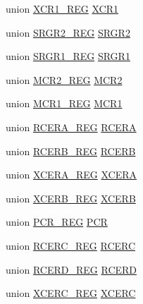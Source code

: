 \begin{DoxyCompactItemize}
\item 
union \hyperlink{union_x_c_r1___r_e_g}{X\+C\+R1\+\_\+\+R\+E\+G} \hyperlink{struct_m_c_b_s_p___r_e_g_s_aad55c90c38f0fbd7c28e0c393a1ca472}{X\+C\+R1}
\item 
union \hyperlink{union_s_r_g_r2___r_e_g}{S\+R\+G\+R2\+\_\+\+R\+E\+G} \hyperlink{struct_m_c_b_s_p___r_e_g_s_a9edcf839e2131e1d5ac33bec4dfdfbfd}{S\+R\+G\+R2}
\item 
union \hyperlink{union_s_r_g_r1___r_e_g}{S\+R\+G\+R1\+\_\+\+R\+E\+G} \hyperlink{struct_m_c_b_s_p___r_e_g_s_aaef2d7c327531024d56ef2c832abbe74}{S\+R\+G\+R1}
\item 
union \hyperlink{union_m_c_r2___r_e_g}{M\+C\+R2\+\_\+\+R\+E\+G} \hyperlink{struct_m_c_b_s_p___r_e_g_s_a2a492e51131b3e651c7b4cee60ac51d0}{M\+C\+R2}
\item 
union \hyperlink{union_m_c_r1___r_e_g}{M\+C\+R1\+\_\+\+R\+E\+G} \hyperlink{struct_m_c_b_s_p___r_e_g_s_a6b0b14fb015f09d3b12a1b8c81fb5e4e}{M\+C\+R1}
\item 
union \hyperlink{union_r_c_e_r_a___r_e_g}{R\+C\+E\+R\+A\+\_\+\+R\+E\+G} \hyperlink{struct_m_c_b_s_p___r_e_g_s_af8cfb2ab1a8c0573c24d932c00cda94c}{R\+C\+E\+R\+A}
\item 
union \hyperlink{union_r_c_e_r_b___r_e_g}{R\+C\+E\+R\+B\+\_\+\+R\+E\+G} \hyperlink{struct_m_c_b_s_p___r_e_g_s_a1ce056a4aa2e55b3084b0b660af84f6e}{R\+C\+E\+R\+B}
\item 
union \hyperlink{union_x_c_e_r_a___r_e_g}{X\+C\+E\+R\+A\+\_\+\+R\+E\+G} \hyperlink{struct_m_c_b_s_p___r_e_g_s_a327b0c3f44de6ccf8d67aed45d89bea0}{X\+C\+E\+R\+A}
\item 
union \hyperlink{union_x_c_e_r_b___r_e_g}{X\+C\+E\+R\+B\+\_\+\+R\+E\+G} \hyperlink{struct_m_c_b_s_p___r_e_g_s_a75cc4624019349288a3ae147f40139e9}{X\+C\+E\+R\+B}
\item 
union \hyperlink{union_p_c_r___r_e_g}{P\+C\+R\+\_\+\+R\+E\+G} \hyperlink{struct_m_c_b_s_p___r_e_g_s_a811bacb4abac4f8cc9c954e318e137d4}{P\+C\+R}
\item 
union \hyperlink{union_r_c_e_r_c___r_e_g}{R\+C\+E\+R\+C\+\_\+\+R\+E\+G} \hyperlink{struct_m_c_b_s_p___r_e_g_s_af968e751882febf7ce7206cd06b322c0}{R\+C\+E\+R\+C}
\item 
union \hyperlink{union_r_c_e_r_d___r_e_g}{R\+C\+E\+R\+D\+\_\+\+R\+E\+G} \hyperlink{struct_m_c_b_s_p___r_e_g_s_a039e5e124554363de2cd0ad15333673f}{R\+C\+E\+R\+D}
\item 
union \hyperlink{union_x_c_e_r_c___r_e_g}{X\+C\+E\+R\+C\+\_\+\+R\+E\+G} \hyperlink{struct_m_c_b_s_p___r_e_g_s_a31b560b4416278397abc2c567fb684c8}{X\+C\+E\+R\+C}

\end{DoxyCompactItemize}
